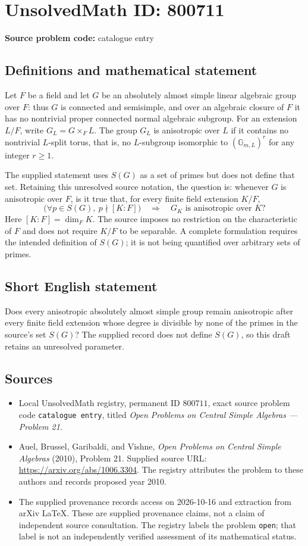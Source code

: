 \documentclass[11pt]{article}
\begin{document}
\section*{UnsolvedMath ID: 800711}
\textbf{Source problem code:} catalogue entry
\subsection{Definitions and mathematical statement}
Let \(F\) be a field and let \(G\) be an absolutely almost simple linear algebraic group over \(F\): thus \(G\) is connected and semisimple, and over an algebraic closure of \(F\) it has no nontrivial proper connected normal algebraic subgroup. For an extension \(L/F\), write \(G_L=G\times_F L\). The group \(G_L\) is anisotropic over \(L\) if it contains no nontrivial \(L\)-split torus, that is, no \(L\)-subgroup isomorphic to \((\mathbb G_{m,L})^r\) for any integer \(r\geq 1\).

The supplied statement uses \(S(G)\) as a set of primes but does not define that set. Retaining this unresolved source notation, the question is: whenever \(G\) is anisotropic over \(F\), is it true that, for every finite field extension \(K/F\),
\[
\bigl(\forall p\in S(G),\ p\nmid [K:F]\bigr)
\quad\Longrightarrow\quad
G_K\text{ is anisotropic over }K?
\]
Here \([K:F]=\dim_F K\). The source imposes no restriction on the characteristic of \(F\) and does not require \(K/F\) to be separable. A complete formulation requires the intended definition of \(S(G)\); it is not being quantified over arbitrary sets of primes.
\subsection{Short English statement}
Does every anisotropic absolutely almost simple group remain anisotropic after every finite field extension whose degree is divisible by none of the primes in the source's set \(S(G)\)? The supplied record does not define \(S(G)\), so this draft retains an unresolved parameter.
\subsection{Sources}
\begin{itemize}
\item Local UnsolvedMath registry, permanent ID \(800711\), exact source problem code \texttt{catalogue entry}, titled \emph{Open Problems on Central Simple Algebras --- Problem 21}.
\item Auel, Brussel, Garibaldi, and Vishne, \emph{Open Problems on Central Simple Algebras} (2010), Problem 21. Supplied source URL: \url{https://arxiv.org/abs/1006.3304}. The registry attributes the problem to these authors and records proposed year 2010.
\item The supplied provenance records access on 2026-10-16 and extraction from arXiv LaTeX. These are supplied provenance claims, not a claim of independent source consultation. The registry labels the problem \texttt{open}; that label is not an independently verified assessment of its mathematical status.
\end{itemize}
\end{document}
